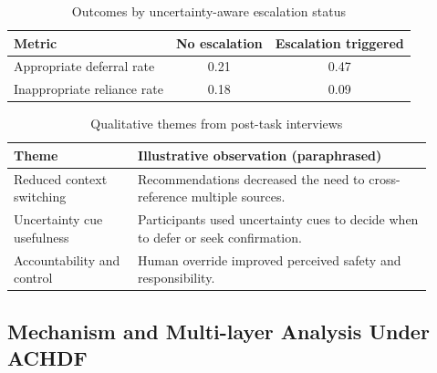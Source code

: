 \documentclass[journal]{IEEEtran}
\theoremstyle{plain}
\theoremstyle{definition}
\begin{document}
    \begin{table}[t]
        \caption{Outcomes by uncertainty-aware escalation status}
        \label{tab:escalation}
        \centering
        \begin{tabular}{lcc}
            \toprule
            \textbf{Metric} & \textbf{No escalation} & \textbf{Escalation triggered} \\
            \midrule
            Appropriate deferral rate & 0.21 & 0.47 \\
            Inappropriate reliance rate & 0.18 & 0.09 \\
            \bottomrule
        \end{tabular}
    \end{table}

    \begin{table}[t]
        \caption{Qualitative themes from post-task interviews}
        \label{tab:qualitative}
        \centering
        \begin{tabular}{p{0.27\linewidth}p{0.64\linewidth}}
            \toprule
            \textbf{Theme} & \textbf{Illustrative observation (paraphrased)} \\
            \midrule
            Reduced context switching & Recommendations decreased the need to cross-reference multiple sources. \\
            Uncertainty cue usefulness & Participants used uncertainty cues to decide when to defer or seek confirmation. \\
            Accountability and control & Human override improved perceived safety and responsibility. \\
            \bottomrule
        \end{tabular}
    \end{table}


    \subsection{Mechanism and Multi-layer Analysis Under ACHDF}
    \label{sec:results_mechanism}
\end{document}

